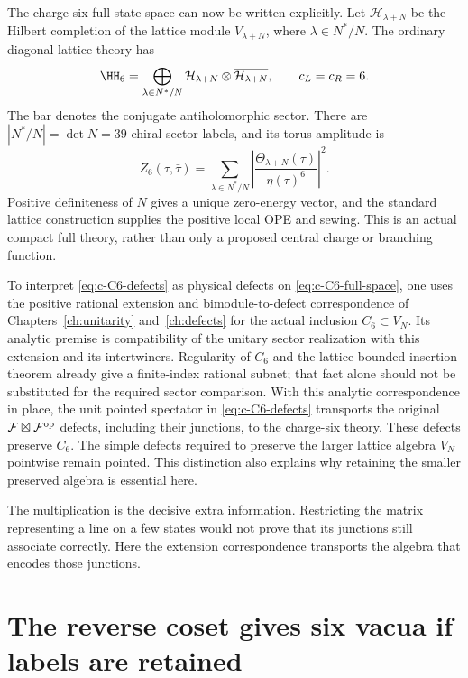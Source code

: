 The charge-six full state space can now be written explicitly.
Let $\mathcal H_{\lambda+N}$ be the Hilbert completion of the
lattice module $V_{\lambda+N}$, where
$\lambda\in N^*/N$. The ordinary diagonal lattice theory has
\begin{equation}\label{eq:c-C6-full-space}
 \HH_6=\bigoplus_{\lambda\in N^*/N}
     \mathcal H_{\lambda+N}\otimes
                     \overline{\mathcal H_{\lambda+N}},
 \qquad c_L=c_R=6.
\end{equation}
The bar denotes the conjugate antiholomorphic sector. There are
$|N^*/N|=\det N=39$ chiral sector labels, and its torus amplitude is
\[
 Z_6(\tau,\bar\tau)=\sum_{\lambda\in N^*/N}
       \left|\frac{\Theta_{\lambda+N}(\tau)}{\eta(\tau)^6}\right|^2.
\]
Positive definiteness of $N$ gives a unique zero-energy vector,
and the standard lattice construction supplies the positive local
OPE and sewing. This is an actual compact full theory, rather than
only a proposed central charge or branching function.

To interpret \eqref{eq:c-C6-defects} as physical defects on
\eqref{eq:c-C6-full-space}, one uses the positive rational extension
and bimodule-to-defect correspondence of
Chapters~\ref{ch:unitarity} and~\ref{ch:defects} for the actual
inclusion $C_6\subset V_N$. Its analytic premise is compatibility
of the unitary sector realization with this extension and its
intertwiners. Regularity of $C_6$ and the lattice bounded-insertion
theorem already give a finite-index rational subnet; that fact
alone should not be substituted for the required sector comparison.
With this analytic correspondence in place, the unit pointed
spectator in \eqref{eq:c-C6-defects} transports the original
$\mathcal F\boxtimes\mathcal F^{\rm op}$ defects, including their
junctions, to the charge-six theory. These defects preserve $C_6$.
The simple defects required to preserve the larger lattice algebra
$V_N$ pointwise remain pointed. This distinction also explains why
retaining the smaller preserved algebra is essential here.

The multiplication is the decisive extra information. Restricting the
matrix representing a line on a few states would not prove that its
junctions still associate correctly. Here the extension correspondence
transports the algebra that encodes those junctions.

\section{The reverse coset gives six vacua if labels are retained}

